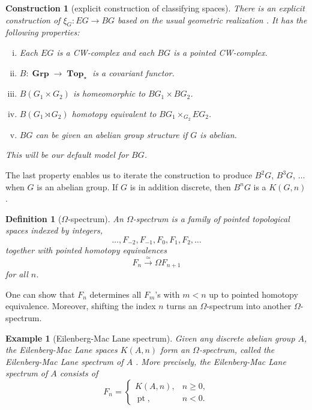 \documentclass[sort&compress]{elsarticle}
\theoremstyle{theoremstyle}
\theoremstyle{framedtheoremstyle}
\theoremstyle{definitionstyle}
\newtheorem{dfn}[nul]{Definition}%
\theoremstyle{definitionstyle}
\theoremstyle{definitionstyle}
\theoremstyle{definitionstyle}
\newtheorem{exm}[nul]{Example}
\newtheorem{cnstr}[nul]{Construction}
\theoremstyle{nameddefinitionstyle}
\theoremstyle{framednameddefinitionstyle}
\theoremstyle{proofstyle}
\theoremstyle{definitionstyle}
\newcommand{\fromto}{\rightarrow}
\newcommand{\xfromto}[1]{\xrightarrow{#1}}
\newcommand{\Top}{\operatorname{\mathbf{Top}}}
\newcommand{\Grp}{\operatorname{\mathbf{Grp}}}
\newcommand{\homotopic}{\simeq}
\newcommand{\paren}[1]{\left( #1 \right)}
\DeclareMathOperator{\pt}{pt}
\begin{document}
\begin{appendices}
\begin{cnstr}[explicit construction of classifying spaces]
There is an explicit construction of $\xi_G: EG \fromto BG$ based on the usual geometric realization \cite{AdemMilgram, Segal1968}. It has the following properties:
\begin{enumerate}[(i)]
\item Each $EG$ is a CW-complex and each $BG$ is a pointed CW-complex.

\item $B: \Grp \fromto \Top_\star$ is a covariant functor.

\item $B(G_1\times G_2)$ is homeomorphic to $BG_1 \times BG_2$.

\item $B\paren{G_1 \rtimes G_2}$ homotopy equivalent to $BG_1 \times_{G_2} EG_2$.

\item $BG$ can be given an abelian group structure if $G$ is abelian.
\end{enumerate}
This will be our default model for $BG$.
\end{cnstr}

The last property enables us to iterate the construction to produce $B^2G$, $B^3G$, $\ldots$ when $G$ is an abelian group. If $G$ is in addition discrete, then $B^nG$ is a $K(G,n)$.

\begin{dfn}[$\Omega$-spectrum]
An $\Omega$-spectrum \cite{Hatcher, Adams1, Adams2} is a family of pointed topological spaces indexed by integers,
\begin{equation}
\ldots, F_{-2}, F_{-1}, F_0, F_1, F_2, \ldots
\end{equation}
together with pointed homotopy equivalences
\begin{equation}
F_n \xfromto{\homotopic} \Omega F_{n+1}
\end{equation}
for all $n$.
\end{dfn}

One can show that $F_n$ determines all $F_m$'s with $m < n$ up to pointed homotopy equivalence. Moreover, shifting the index $n$ turns an $\Omega$-spectrum into another $\Omega$-spectrum.

\begin{exm}[Eilenberg-Mac Lane spectrum]\label{exm:Eilenberg_MacLane_spectrum}
Given any discrete abelian group $A$, the Eilenberg-Mac Lane spaces $K(A,n)$ form an $\Omega$-spectrum, called the Eilenberg-Mac Lane spectrum of $A$ \cite{Hatcher, Adams1, Adams2}. More precisely, the Eilenberg-Mac Lane spectrum of $A$ consists of
\begin{equation}
F_n = \begin{cases}
K(A,n), & n \geq 0, \\
\pt, & n < 0.
\end{cases}
\end{equation}
\end{exm}


\end{appendices}
\end{document}
